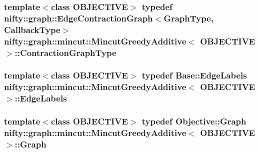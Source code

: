 \subsubsection[{Contraction\+Graph\+Type}]{\setlength{\rightskip}{0pt plus 5cm}template$<$class O\+B\+J\+E\+C\+T\+I\+V\+E$>$ typedef {\bf nifty\+::graph\+::\+Edge\+Contraction\+Graph}$<${\bf Graph\+Type}, {\bf Callback\+Type}$>$ {\bf nifty\+::graph\+::mincut\+::\+Mincut\+Greedy\+Additive}$<$ O\+B\+J\+E\+C\+T\+I\+V\+E $>$\+::{\bf Contraction\+Graph\+Type}}\label{classnifty_1_1graph_1_1mincut_1_1MincutGreedyAdditive_a12888919099a9985cffc747e7f3fc1ed}
\hypertarget{classnifty_1_1graph_1_1mincut_1_1MincutGreedyAdditive_a47f668deb35f848d7b50a9a79e5f74e4}{}
\subsubsection[{Edge\+Labels}]{\setlength{\rightskip}{0pt plus 5cm}template$<$class O\+B\+J\+E\+C\+T\+I\+V\+E$>$ typedef {\bf Base\+::\+Edge\+Labels} {\bf nifty\+::graph\+::mincut\+::\+Mincut\+Greedy\+Additive}$<$ O\+B\+J\+E\+C\+T\+I\+V\+E $>$\+::{\bf Edge\+Labels}}\label{classnifty_1_1graph_1_1mincut_1_1MincutGreedyAdditive_a47f668deb35f848d7b50a9a79e5f74e4}
\hypertarget{classnifty_1_1graph_1_1mincut_1_1MincutGreedyAdditive_adbc5d902d56346bd222c951ba5948d09}{}
\subsubsection[{Graph}]{\setlength{\rightskip}{0pt plus 5cm}template$<$class O\+B\+J\+E\+C\+T\+I\+V\+E$>$ typedef Objective\+::\+Graph {\bf nifty\+::graph\+::mincut\+::\+Mincut\+Greedy\+Additive}$<$ O\+B\+J\+E\+C\+T\+I\+V\+E $>$\+::{\bf Graph}}\label{classnifty_1_1graph_1_1mincut_1_1MincutGreedyAdditive_adbc5d902d56346bd222c951ba5948d09}
\hypertarget{classnifty_1_1graph_1_1mincut_1_1MincutGreedyAdditive_a791534df9aec04248e1931ca6c2cf764}{}
